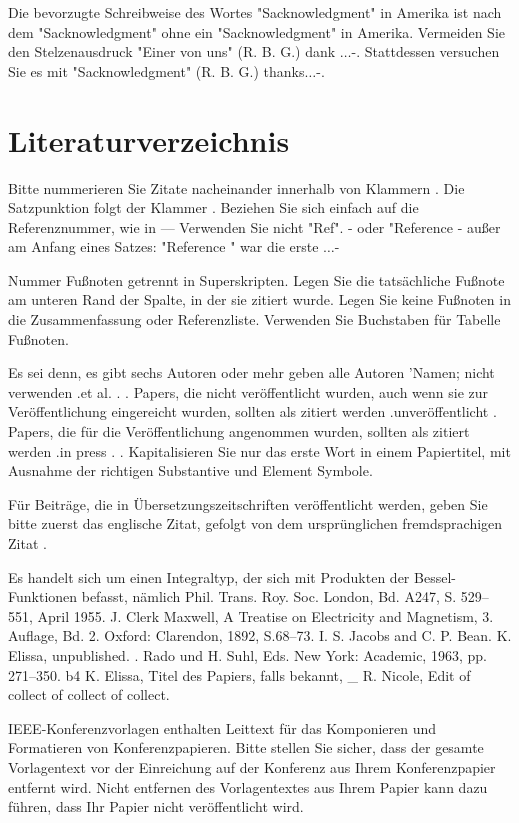 \documentclass[conference]{IEEEtran}
\begin{document}
Die bevorzugte Schreibweise des Wortes "Sacknowledgment" in Amerika ist nach dem "Sacknowledgment" ohne ein "Sacknowledgment" in Amerika. Vermeiden Sie den Stelzenausdruck "Einer von uns" (R. B. G.) dank $\ldots$-. Stattdessen versuchen Sie es mit "Sacknowledgment" (R. B. G.) thanks$\ldots$-.

\section*{Literaturverzeichnis}

Bitte nummerieren Sie Zitate nacheinander innerhalb von Klammern \cite{b1}. Die Satzpunktion folgt der Klammer \cite{b2}. Beziehen Sie sich einfach auf die Referenznummer, wie in \cite{b3}— Verwenden Sie nicht "Ref". \cite{b3}- oder "Reference \cite{b3}- außer am Anfang eines Satzes: "Reference \cite{b3}" war die erste $\ldots$-

Nummer Fußnoten getrennt in Superskripten. Legen Sie die tatsächliche Fußnote am unteren Rand der Spalte, in der sie zitiert wurde. Legen Sie keine Fußnoten in die Zusammenfassung oder Referenzliste. Verwenden Sie Buchstaben für Tabelle Fußnoten.

Es sei denn, es gibt sechs Autoren oder mehr geben alle Autoren 'Namen; nicht verwenden .et al. . . Papers, die nicht veröffentlicht wurden, auch wenn sie zur Veröffentlichung eingereicht wurden, sollten als zitiert werden .unveröffentlicht \cite{b4}. Papers, die für die Veröffentlichung angenommen wurden, sollten als zitiert werden .in press . \cite{b5}. Kapitalisieren Sie nur das erste Wort in einem Papiertitel, mit Ausnahme der richtigen Substantive und Element Symbole.

Für Beiträge, die in Übersetzungszeitschriften veröffentlicht werden, geben Sie bitte zuerst das englische Zitat, gefolgt von dem ursprünglichen fremdsprachigen Zitat \cite{b6}.

\begin{thebibliography}Es handelt sich um einen Integraltyp, der sich mit Produkten der Bessel-Funktionen befasst, nämlich Phil. Trans. Roy. Soc. London, Bd. A247, S. 529–551, April 1955.  J. Clerk Maxwell, A Treatise on Electricity and Magnetism, 3. Auflage, Bd. 2. Oxford: Clarendon, 1892, S.68–73.  I. S. Jacobs and C. P. Bean.  K. Elissa, unpublished. \bibitemH. Rado und H. Suhl, Eds. New York: Academic, 1963, pp. 271–350. {b4} K. Elissa, Titel des Papiers, falls bekannt, _ R. Nicole, Edit of collect of collect of collect.
\end{thebibliography}


\color{red} IEEE-Konferenzvorlagen enthalten Leittext für das Komponieren und Formatieren von Konferenzpapieren. Bitte stellen Sie sicher, dass der gesamte Vorlagentext vor der Einreichung auf der Konferenz aus Ihrem Konferenzpapier entfernt wird. Nicht entfernen des Vorlagentextes aus Ihrem Papier kann dazu führen, dass Ihr Papier nicht veröffentlicht wird.
\end{document}
